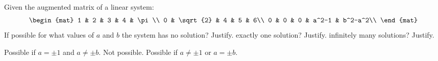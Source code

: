 

\begin{Exercise}[name={},
title={}, 
origin={\cite{YL}},
counter=Exercise]
Given the augmented matrix of a linear system:
\[
\begin{mat}
1 & 2 & 3 & 4 & \pi\\
0 & \sqrt{2} & 4 & 5 & 6\\
0 & 0 & 0 & a^2-1 & b^2-a^2\\
\end{mat}
\]
If possible for what values of $a$ and $b$ the system has
\Question no solution? Justify.
\Question exactly one solution? Justify.
\Question infinitely many solutions? Justify.
\end{Exercise}

\begin{Answer}
\Question
Possible if $a=\pm 1$ and $a\neq \pm b$.
\Question
Not possible.
\Question
Possible if $a\neq\pm 1$ or $a=\pm b$.
\end{Answer}

